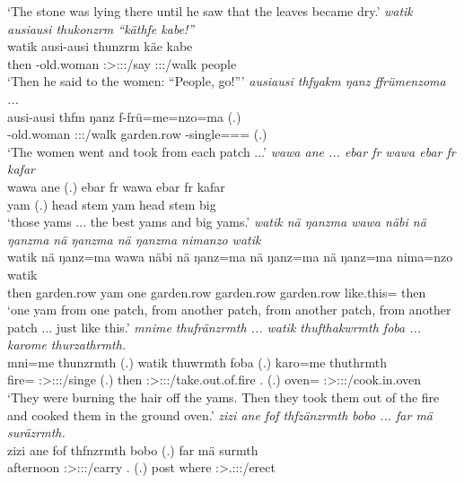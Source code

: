 \begin{exe}
	\trans `The stone was lying there until he saw that the leaves became dry.'
	\emph{watik ausiausi thukonzrm ``käthfe kabe!''}\\
	\gll watik ausi-ausi thunzrm käe kabe\\ 
	then \Redup-old.woman \Sg:\Sbj>\Stpl:\Obj:\Pst:\Dur/say \Spl:\Sbj:\Imp:\Pfv/walk people\\
	\trans `Then he said to the women: ``People, go!'''
	\emph{ausiausi thfyakm ŋanz ffrümenzoma ...}\\
	\gll ausi-ausi thfm ŋanz f-frü=me=nzo=ma (.)\\ 
	\Redup-old.woman \Stpl:\Sbj:\Pst:\Dur/walk garden.row \Redup-single=\Ins=\Only={\Char} (.)\\
	\trans `The women went and took from each patch ...'
	\emph{wawa ane ... ebar fr wawa ebar fr kafar}\\
	\gll wawa ane (.) ebar fr wawa ebar fr kafar\\ 
	yam {\Dem} (.) head stem yam head stem big\\
	\trans `those yams ... the best yams and big yams.'
	\emph{watik nä ŋanzma wawa näbi nä ŋanzma nä ŋanzma nä ŋanzma nimanzo watik}\\
	\gll watik nä ŋanz=ma wawa näbi nä ŋanz=ma nä ŋanz=ma nä ŋanz=ma nima=nzo watik\\ 
	then {\Indf} garden.row yam one {\Indf} garden.row {\Indf} garden.row {\Indf} garden.row like.this={\Only} then\\
	\trans `one yam from one patch, from another patch, from another patch, from another patch ... just like this.'
	\emph{mnime thufränzrmth ... watik thufthakwrmth foba ... karome thurzathrmth.}\\
	\gll mni=me thunzrmth (.) watik thuwrmth foba (.) karo=me thuthrmth\\ 
	fire={\Ins} \Stpl:\Sbj>\Stpl:\Obj:\Pst:\Dur/singe (.) then \Stpl:\Sbj>\Stpl:\Obj:\Pst:\Dur/take.out.of.fire \Dist.{\Abl} (.) oven={\Ins} \Stpl:\Sbj>\Stpl:\Obj:\Pst:\Dur/cook.in.oven\\
	\trans `They were burning the hair off the yams. Then they took them out of the fire and cooked them in the ground oven.'
	\emph{zizi ane fof thfzänzrmth bobo ... far mä suräzrmth.}\\
	\gll zizi ane fof thfnzrmth bobo (.) far mä surmth\\ 
	afternoon {\Dem} {\Emph} \Stpl:\Sbj>\Stpl:\Obj:\Pst:\Dur/carry \Med.{\All} (.) post where \Stpl:\Sbj>\Tsg.\Masc:\Obj:\Pst:\Dur/erect\\

\end{exe}
